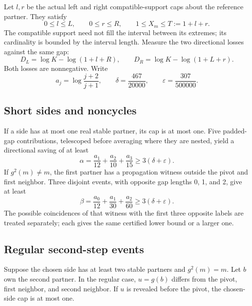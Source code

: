 \documentclass[11pt,letterpaper]{article}
\theoremstyle{remark}
\numberwithin{equation}{section}
\begin{document}
Let \(l,r\) be the actual left and right compatible-support caps about
the reference partner. They satisfy
\begin{equation}\label{eq:caps}
  0\le l\le L,\qquad 0\le r\le R,\qquad
  1\le X_m\le T:=1+l+r.
\end{equation}
The compatible support need not fill the interval between its extremes;
its cardinality is bounded by the interval length. Measure the two
directional losses against the same gap:
\begin{equation}\label{eq:losses}
  D_L=\log K-\log(1+l+R),\qquad
  D_R=\log K-\log(1+L+r).
\end{equation}
Both losses are nonnegative. Write
\begin{equation}\label{eq:constants}
  a_j=\log\frac{j+2}{j+1},\qquad
  \delta=\frac{467}{20000},\qquad
  \varepsilon=\frac{307}{500000}.
\end{equation}

\subsection{Short sides and noncycles}

If a side has at most one real stable partner, its cap is at most one.
Five padded-gap contributions, telescoped before averaging where they
are nested, yield a directional saving of at least
\begin{equation}\label{eq:alpha}
  \alpha=\frac{a_1}{12}+\frac{a_2}{10}+\frac{a_3}{15}
  \ge 3(\delta+\varepsilon).
\end{equation}
If \(g^2(m)\ne m\), the first partner has a propagation witness outside
the pivot and first neighbor. Three disjoint events, with opposite
gap lengths 0, 1, and 2, give at least
\begin{equation}\label{eq:beta}
  \beta=\frac{a_0}{12}+\frac{a_1}{30}+\frac{a_2}{60}
  \ge 3(\delta+\varepsilon).
\end{equation}
The possible coincidences of that witness with the first three opposite
labels are treated separately; each gives the same certified lower
bound or a larger one.

\subsection{Regular second-step events}

Suppose the chosen side has at least two stable partners and
\(g^2(m)=m\). Let \(b\) own the second partner. In the regular case,
\(u=g(b)\) differs from the pivot, first neighbor, and second neighbor.
If \(u\) is revealed before the pivot, the chosen-side cap is at most one.
\end{document}
